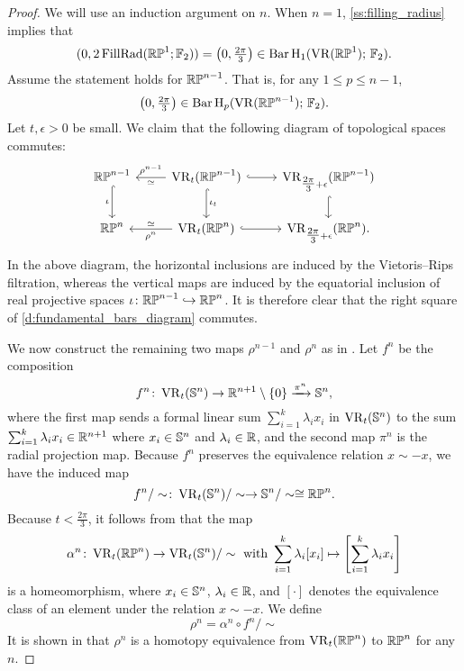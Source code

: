 \begin{proof}
	We will use an induction argument on $n$.
	When $n = 1$, \cref{ss:filling_radius} implies that
	\[
	(0, 2\operatorname{FillRad}(\mathbb{RP}^1;{\mathbb{F}_2})) = \left(0, \tfrac{2\pi}{3}\right) \in \operatorname{Bar} \operatorname{H}_{1}(\operatorname{VR}(\mathbb{RP}^1);\,{\mathbb{F}_2}).
	\]
	Assume the statement holds for $\mathbb{RP}^{n-1}$.
	That is, for any $1 \leq p \leq n-1$,
	\[
	\left(0, \tfrac{2\pi}{3}\right) \in \operatorname{Bar} \operatorname{H}_{p}(\operatorname{VR}(\mathbb{RP}^{n-1});\,{\mathbb{F}_2}).
	\]
	Let $t, \epsilon > 0$ be small.
	We claim that the following diagram of topological spaces commutes:
	\begin{equation}\label{d:fundamental_bars_diagram}
		\begin{tikzcd}
			\rp^{n-1}
			\ar[d, hook,"{\iota}" left]
			&
			\VR_t(\rp^{n-1})
			\ar[d, hook,"\iota_t"]
			\ar[l, "\rho^{n-1}" above, "\simeq" below]
			\ar[r, hook]
			&
			\VR_{\tfrac{2\pi}{3}+\epsilon}(\rp^{n-1})
			\ar[d, hook]
			\\
			\rp^{n}
			&
			\VR_t(\rp^{n})
			\ar[l, "\rho^n" below, "\simeq" above]
			\ar[r, hook]
			&
			\VR_{\tfrac{2\pi}{3}+\epsilon}(\rp^{n}).
		\end{tikzcd}
	\end{equation}
	In the above diagram, the horizontal inclusions are induced by the Vietoris--Rips filtration, whereas the vertical maps are induced by the equatorial inclusion of real projective spaces $\iota \colon \mathbb{RP}^{n-1} \hookrightarrow \mathbb{RP}^{n}$.
	It is therefore clear that the right square of \eqref{d:fundamental_bars_diagram} commutes.
	
	We now construct the remaining two maps $\rho^{n-1}$ and $\rho^{n}$ as in \cite[]{adams2022metric}.
	Let $f^n$ be the composition
	\[
	f^n \colon \operatorname{VR}_t(\mathbb{S}^n) \to \mathbb{R}^{n+1} \setminus \{0\} \xrightarrow{\pi^n} \mathbb{S}^{n},
	\]
	where the first map sends a formal linear sum $\sum_{i=1}^k \lambda_i x_i$ in $\operatorname{VR}_t(\mathbb{S}^n)$ to the sum $\sum_{i=1}^k \lambda_i x_i \in \mathbb{R}^{n+1}$ where $x_i \in \mathbb{S}^{n}$ and $\lambda_i \in \mathbb{R}$, and the second map $\pi^n$ is the radial projection map. 
	Because $f^n$ preserves the equivalence relation $x \sim -x$, we have the induced map %
	\[
	f^n/\sim \colon \operatorname{VR}_t(\mathbb{S}^{n})/\sim\to \mathbb{S}^{n}/\sim\cong \mathbb{RP}^n.
	\]
	Because $t < \tfrac{2\pi}{3}$, it follows from \cite[Lemma 4.4]{adams2022metric} that the map
	\[
	\alpha^n \colon \operatorname{VR}_t(\mathbb{RP}^n) \to \operatorname{VR}_t(\mathbb{S}^n)/\sim \text{ with }
	\sum_{i=1}^k \lambda_i [x_i] \mapsto \left[\sum_{i=1}^k \lambda_i x_i\right]
	\]
	is a homeomorphism, where $x_i \in \mathbb{S}^{n}$, $\lambda_i \in \mathbb{R}$, and $[\cdot]$ denotes the equivalence class of an element under the relation $x \sim -x$. 
	We define
	\[\rho^n = \alpha^n \circ f^n/\sim \]
	It is shown in \cite[Theorem 4.5]{adams2022metric} that $\rho^n$ is a homotopy equivalence from $\operatorname{VR}_t(\mathbb{RP}^n)$ to $\mathbb{RP}^n$ for any $n$.
	

\end{proof}
